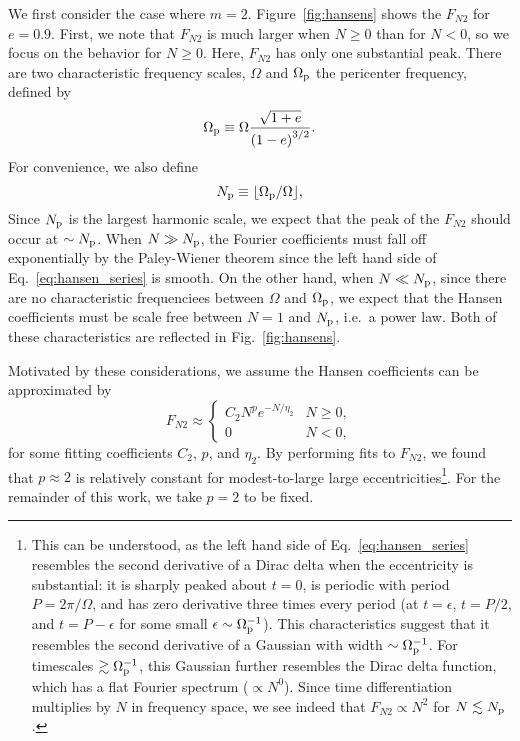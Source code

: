 \documentclass[
        fleqn,
        usenatbib,
    ]{mnras}
\newcommand*{\p}[1]{\left(#1\right)}
\begin{document}
We first consider the case where $m = 2$. Figure~\ref{fig:hansens} shows
the $F_{N2}$ for $e = 0.9$. First, we note that $F_{N2}$ is much larger when $N
\geq 0$ than for $N < 0$, so we focus on the behavior for $N \geq 0$. Here,
$F_{N2}$ has only one substantial peak. There are two characteristic frequency
scales, $\Omega$ and $\Omega_{\rm p}$ the pericenter frequency, defined by
\begin{equation}
    \Omega_{\rm p} \equiv \Omega \frac{\sqrt{1 + e}}{\p{1 - e}^{3/2}}.
        \label{eq:Wperi}
\end{equation}
For convenience, we also define
\begin{equation}
    N_{\rm p} \equiv \lfloor \Omega_{\rm p} / \Omega\rfloor,
\end{equation}
Since $N_{\rm p}$ is the largest harmonic scale, we expect that the peak of the
$F_{N2}$ should occur at $\sim N_{\rm p}$. When $N \gg N_{\rm p}$, the Fourier
coefficients must fall off exponentially by the Paley-Wiener theorem since the
left hand side of Eq.~\eqref{eq:hansen_series} is smooth. On the other hand,
when $N \ll N_{\rm p}$, since there are no characteristic frequenciees between
$\Omega$ and $\Omega_{\rm p}$, we expect that the Hansen coefficients must be
scale free between $N = 1$ and $N_{\rm p}$, i.e.\ a power law. Both of these
characteristics are reflected in Fig.~\ref{fig:hansens}.

Motivated by these considerations, we assume the Hansen coefficients can be
approximated by
\begin{equation}
    F_{N2} \approx
    \begin{cases}
        C_2 N^{p}e^{-N/\eta_2} & N \geq 0,\\
        0 & N < 0,
    \end{cases}\label{eq:fn2_fit}
\end{equation}
for some fitting coefficients $C_2$, $p$, and $\eta_2$. By performing fits to
$F_{N2}$, we found that $p \approx 2$ is relatively constant for modest-to-large
large eccentricities\footnote{This can be understood, as the left hand side of
Eq.~\eqref{eq:hansen_series} resembles the second derivative of a Dirac delta
when the eccentricity is substantial: it is sharply peaked about $t = 0$, is
periodic with period $P = 2\pi / \Omega$, and has zero derivative three times
every period (at $t = \epsilon$, $t = P / 2$, and $t = P - \epsilon$ for some
small $\epsilon \sim \Omega_{\rm p}^{-1}$). This characteristics suggest that it
resembles the second derivative of a Gaussian with width $\sim \Omega_{\rm
p}^{-1}$. For timescales $\gtrsim \Omega_{\rm p}^{-1}$, this Gaussian further
resembles the Dirac delta function, which has a flat Fourier spectrum ($\propto
N^0$). Since time differentiation multiplies by $N$ in frequency space, we see
indeed that $F_{N2} \propto N^2$ for $N \lesssim N_{\rm p}$.}. For
the remainder of this work, we
take $p = 2$ to be fixed.
\end{document}
